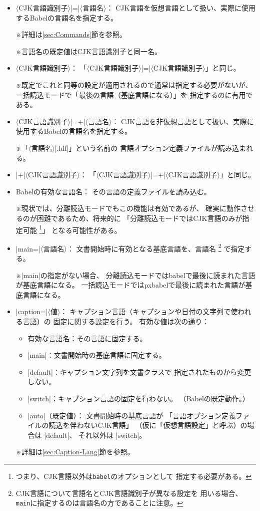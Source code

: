 \documentclass[uplatex,dvipdfmx,a4paper]{jsarticle}
\newcommand{\Pkg}[1]{\textsf{#1}}
\newcommand{\Meta}[1]{$\langle$\mbox{}#1\mbox{}$\rangle$}
\newcommand{\Note}{\par\noindent ※}
\newcommand{\Means}{：\quad\inhibitglue}
\begin{document}
\begin{itemize}
\item \Meta{CJK言語識別子}|=|\Meta{言語名}\Means
CJK言語を仮想言語として扱い、実際に使用するBabelの言語名を指定する。
\Note 詳細は\ref{sec:Commands}節を参照。
\Note 言語名の既定値はCJK言語識別子と同一名。

\item \Meta{CJK言語識別子}\Means
「\Meta{CJK言語識別子}|=|\Meta{CJK言語識別子}」と同じ。
\Note 既定でこれと同等の設定が適用されるので通常は指定する必要がないが、
一括読込モードで「最後の言語（基底言語になる）」を
指定するのに有用である。

\item \Meta{CJK言語識別子}|=+|\Meta{言語名}\Means
CJK言語を非仮想言語として扱い、実際に使用するBabelの言語名を指定する。
\Note 「\Meta{言語名}|.ldf|」という名前の
言語オプション定義ファイルが読み込まれる。

\item |+|\Meta{CJK言語識別子}\Means
「\Meta{CJK言語識別子}|=+|\Meta{CJK言語識別子}」と同じ。

\item Babelの有効な言語名\Means
その言語の定義ファイルを読み込む。
\Note 現状では、分離読込モードでもこの機能は有効であるが、
確実に動作させるのが困難であるため、将来的に
「分離読込モードではCJK言語のみが指定可能
\footnote{つまり、CJK言語以外は\texttt{babel}のオプションとして
指定する必要がある。}」
となる可能性がある。

\item |main=|\Meta{言語名}\Means
文書開始時に有効となる基底言語を、言語名
\footnote{CJK言語について言語名とCJK言語識別子が異なる設定を
用いる場合、\texttt{main}に指定するのは言語名の方であることに注意。}%
で指定する。
\Note |main|の指定がない場合、
分離読込モードでは\Pkg{babel}で最後に読まれた言語が基底言語になる。
一括読込モードでは\Pkg{pxbabel}で最後に読まれた言語が基底言語になる。

\item |caption=|\Meta{値}\Means
キャプション言語（キャプションや日付の文字列で使われる言語）の
固定に関する設定を行う。
有効な値は次の通り：
  \begin{itemize}
  \item 有効な言語名\Means その言語に固定する。
  \item |main|\Means 文書開始時の基底言語に固定する。
  \item |default|\Means キャプション文字列を文書クラスで
  指定されたものから変更しない。
  \item |switch|\Means キャプション言語の固定を行わない。
  （Babelの既定動作。）
  \item |auto|（既定値）\Means
  文書開始時の基底言語が
  「言語オプション定義ファイルの読込を伴わないCJK言語」
  （仮に「仮想言語設定」と呼ぶ）の場合は |default|、
  それ以外は |switch|。
  \end{itemize}
\Note 詳細は\ref{sec:Caption-Lang}節を参照。


\end{itemize}
\end{document}
